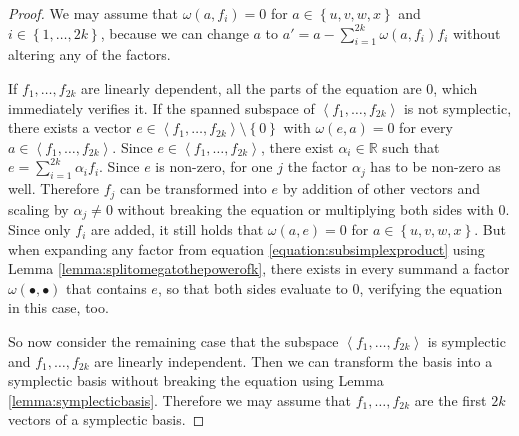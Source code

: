 \documentclass[../SymplecticSimplices.tex]{subfiles}
\begin{document}
\begin{proof}
  We may assume that \( \omega \left( a, f_i \right) = 0 \) for \( a \in \left\lbrace u, v, w, x \right\rbrace \) and \( i \in \left\lbrace 1, \dots, 2k \right\rbrace \), because we can change \( a \) to \( a' = a - \sum\limits_{i=1}^{2k} \omega \left( a, f_i \right) f_i \) without altering any of the factors.

  If \(f_1, \dots, f_{2k}\) are linearly dependent, all the parts of the equation are \( 0 \), which immediately verifies it. If the spanned subspace of \( \left< f_1, \dots, f_{2k} \right> \) is not symplectic, there exists a vector \( e \in \left< f_1, \dots, f_{2k} \right> \setminus \left\lbrace 0 \right\rbrace \) with \( \omega \left( e, a \right) = 0 \) for every \( a \in \left< f_1, \dots, f_{2k} \right> \). Since \( e \in \left< f_1, \dots, f_{2k} \right> \), there exist \( \alpha_i \in \mathbb{R} \) such that \( e = \sum_{i=1}^{2k} \alpha_i f_i \). Since \( e \) is non-zero, for one \( j \) the factor \( \alpha_j \) has to be non-zero as well. Therefore \( f_j \) can be transformed into \( e \) by addition of other vectors and scaling by \( \alpha_j \neq 0 \) without breaking the equation or multiplying both sides with \( 0 \). Since only \( f_i \) are added, it still holds that \( \omega \left( a, e \right) = 0 \) for \( a \in \left\lbrace u, v, w, x \right\rbrace \). But when expanding any factor from equation \eqref{equation:subsimplexproduct} using Lemma \ref{lemma:splitomegatothepowerofk}, there exists in every summand a factor \( \omega \left( \bullet, \bullet \right) \) that contains \( e \), so that both sides evaluate to \( 0 \), verifying the equation in this case, too.
  
  So now consider the remaining case that the subspace \( \left< f_1, \dots, f_{2k} \right> \) is symplectic and \( f_1, \dots, f_{2k} \) are linearly independent. Then we can transform the basis into a symplectic basis without breaking the equation using Lemma \ref{lemma:symplecticbasis}.
Therefore we may assume that \( f_1, \dots, f_{2k} \) are the first \( 2k \) vectors of a symplectic basis.


\end{proof}
\end{document}
